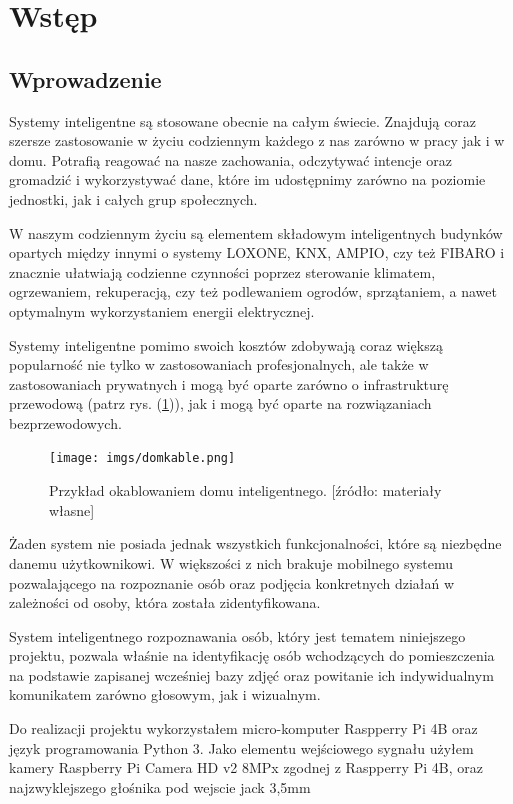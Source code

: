 \documentclass[a4paper,12pt,reqno]{article}
\begin{document}
%
%
\section{Wstęp} \label{section:wstep}

\subsection{Wprowadzenie}

Systemy inteligentne są stosowane obecnie na całym świecie. Znajdują coraz szersze zastosowanie w życiu codziennym każdego z nas zarówno w pracy jak i w domu. Potrafią reagować na nasze zachowania, odczytywać intencje oraz gromadzić i wykorzystywać dane, które im udostępnimy zarówno na poziomie jednostki, jak i całych grup społecznych.

W naszym codziennym życiu są elementem składowym inteligentnych budynków opartych między innymi o systemy LOXONE, KNX, AMPIO, czy też FIBARO i znacznie ułatwiają codzienne czynności poprzez sterowanie klimatem, ogrzewaniem, rekuperacją, czy też podlewaniem ogrodów, sprzątaniem, a nawet optymalnym wykorzystaniem energii elektrycznej.

Systemy inteligentne pomimo swoich kosztów zdobywają coraz większą popularność nie tylko w zastosowaniach profesjonalnych, ale także w zastosowaniach prywatnych i mogą być oparte zarówno o infrastrukturę przewodową (patrz rys. (\ref{kable})), jak i mogą być oparte na rozwiązaniach bezprzewodowych.

\begin{figure}[!ht]%
\centering
\texttt{[image: imgs/domkable.png]}
\caption{Przykład okablowaniem domu inteligentnego. [źródło: materiały własne] \label{kable}}
\quad
\end{figure}

Żaden system nie posiada jednak wszystkich funkcjonalności, które są niezbędne danemu użytkownikowi. W większości z nich brakuje mobilnego systemu pozwalającego na rozpoznanie osób oraz podjęcia konkretnych działań w zależności od osoby, która została zidentyfikowana.

System inteligentnego rozpoznawania osób, który jest tematem niniejszego projektu, pozwala właśnie na identyfikację osób wchodzących do pomieszczenia na podstawie zapisanej wcześniej bazy zdjęć oraz powitanie ich indywidualnym komunikatem zarówno głosowym, jak i wizualnym.

Do realizacji projektu wykorzystałem micro-komputer Raspperry Pi 4B oraz język programowania Python 3. Jako elementu wejściowego sygnału użyłem kamery Raspberry Pi Camera HD v2 8MPx zgodnej z Raspperry Pi 4B, oraz najzwyklejszego głośnika pod wejscie jack 3,5mm
\end{document}

